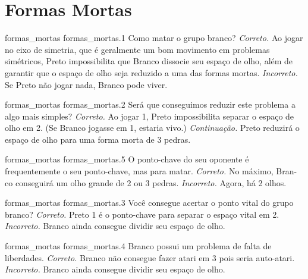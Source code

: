 \chapter{Formas Mortas}

\emptypage

\problemAnswerDiagram
  {formas_mortas}
  {formas_mortas.1}
  {Como matar o grupo branco?}
  {\emph{Correto.} Ao jogar no eixo de simetria, que é geralmente um bom movimento em problemas simétricos, Preto impossibilita que Branco dissocie seu espaço de olho, além de garantir que o espaço de olho seja reduzido a uma das formas mortas.}
  {\emph{Incorreto.} Se Preto não jogar nada, Branco pode viver.}

\problemAnswerDiagram
  {formas_mortas}
  {formas_mortas.2}
  {Será que conseguimos reduzir este problema a algo mais simples?}
  {\emph{Correto.} Ao jogar 1, Preto impossibilita separar o espaço de olho em 2. (Se Branco jogasse em 1, estaria vivo.)}
  {\emph{Continuação.} Preto reduzirá o espaço de olho para uma forma morta de 3 pedras.}

\problemAnswerDiagram
  {formas_mortas}
  {formas_mortas.5}
  {O ponto-chave do seu oponente é frequentemente o seu ponto-chave, mas para matar.}
  {\emph{Correto.} No máximo, Bran-co conseguirá um olho grande de 2 ou 3 pedras.}
  {\emph{Incorreto.} Agora, há 2 olhos.}

\problemAnswerDiagram
  {formas_mortas}
  {formas_mortas.3}
  {Você consegue acertar o ponto vital do grupo branco?}
  {\emph{Correto.} Preto 1 é o ponto-chave para separar o espaço vital em 2.}
  {\emph{Incorreto.} Branco ainda consegue dividir seu espaço de olho.}

\problemAnswerDiagram
  {formas_mortas}
  {formas_mortas.4}
  {Branco possui um problema de falta de liberdades.}
  {\emph{Correto.} Branco não consegue fazer atari em 3 pois seria auto-atari.}
  {\emph{Incorreto.} Branco ainda consegue dividir seu espaço de olho.}